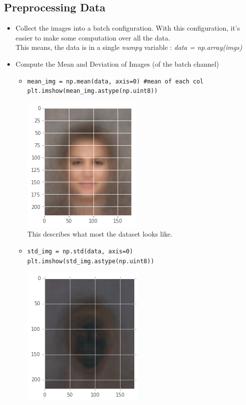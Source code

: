 \documentclass[12pt,a4paper]{article}
\begin{document}
\subsection{Preprocessing Data}
\begin{itemize}
\item Collect the images into a batch configuration. With this configuration, it's easier to make some computation over all the data.\\
This means, the data is in a single \textit{numpy} variable : \textit{data = np.array(imgs)}
\item Compute the Mean and Deviation of Images (of the batch channel)
\begin{itemize}
\item \begin{lstlisting}
mean_img = np.mean(data, axis=0) #mean of each col
plt.imshow(mean_img.astype(np.uint8))
\end{lstlisting}
\includegraphics[scale=0.5]{dataMean}\\
This describes what most the dataset looks like.
\item \begin{lstlisting}
std_img = np.std(data, axis=0)
plt.imshow(std_img.astype(np.uint8))
\end{lstlisting}
\includegraphics[scale=0.5]{dataStd}\\

\end{itemize}
\end{itemize}
\end{document}
